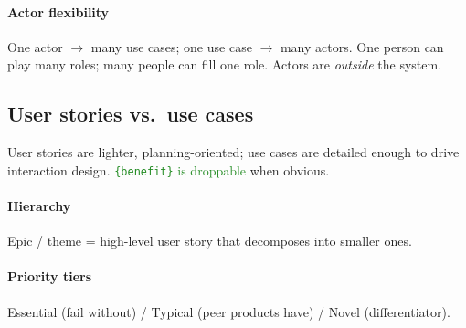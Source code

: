 \paragraph{Actor flexibility}
One actor $\to$ many use cases; one use case $\to$ many actors. One person can play many roles; many people can fill one role. Actors are \emph{outside} the system.

\subsection{User stories vs.\ use cases}
\textcolor{Bittersweet}{User stories} are lighter, planning-oriented; \textcolor{Bittersweet}{use cases} are detailed enough to drive interaction design. \textcolor{ForestGreen}{\texttt{\{benefit\}} is droppable} when obvious.
\paragraph{Hierarchy} \textcolor{Bittersweet}{Epic / theme} = high-level user story that decomposes into smaller ones.

\paragraph{Priority tiers}
\textcolor{Bittersweet}{Essential} (fail without) / \textcolor{Bittersweet}{Typical} (peer products have) / \textcolor{Bittersweet}{Novel} (differentiator).
